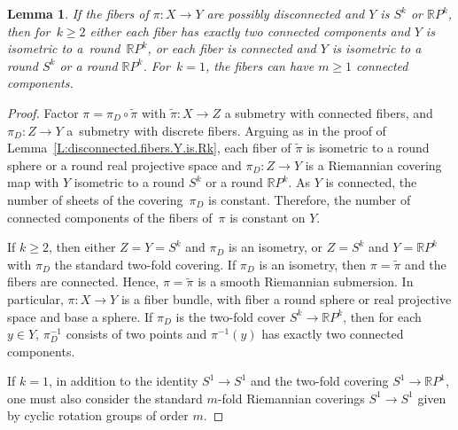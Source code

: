 \documentclass[10pt,a4paper]{amsart}
\numberwithin{equation}{section}
\newtheorem{lem}[thm]{Lemma}
\theoremstyle{definition}
\newcommand{\Sp}{S} %
\newcommand{\RP}{\mathbb{R}P} %
\begin{document}
\begin{lem}
If the fibers of $\pi\colon X\to Y$ are possibly disconnected and $Y$ is $S^k$ or $\RP^k$, then for~${k\geq 2}$ either each fiber has exactly two connected components and $Y$ is isometric to a~round~$\RP^{k}$, or each fiber is connected and $Y$ is isometric to a round $\Sp^k$ or a round $\RP^k$. For~${k=1}$, the fibers can have $m\geq 1$ connected components.
\end{lem}

\begin{proof}
Factor $\pi=\pi_D\circ\tilde{\pi}$ with $\tilde{\pi}\colon X\to Z$ a submetry with connected fibers, and $\pi_D\colon Z\to Y$ a~submetry with discrete fibers.
Arguing as in the proof of Lemma~\ref{L:disconnected.fibers.Y.is.Rk}, each fiber of $\tilde{\pi}$ is isometric to a round sphere or a round real projective space and $\pi_D\colon Z\to Y$ is a Riemannian covering map with $Y$ isometric to a round $S^k$ or a round $\RP^k$.
As $Y$ is connected, the number of sheets of the covering~$\pi_D$ is constant. Therefore, the number of connected components of the fibers of~$\pi$ is constant on $Y$.

If $k\geq 2$, then either $Z=Y = S^k$ and $\pi_D$ is an isometry, or $Z=S^k$ and $Y=\RP^k$ with $\pi_D$ the standard two-fold covering.
If $\pi_D$ is an isometry, then $\pi = \tilde{\pi}$ and the fibers are connected.
Hence, $\pi = \tilde{\pi}$ is a smooth Riemannian submersion. In particular, $\pi\colon X\to Y$ is a fiber bundle, with fiber a round sphere or real projective space and base a sphere. If $\pi_D$ is the two-fold cover $S^k\to \RP^k$, then for each $y\in Y$, $\pi^{-1}_D$ consists of two points and $\pi^{-1}(y)$ has exactly two connected components.

If $k=1$, in addition to the identity $S^1\to S^1$ and the two-fold covering $S^1\to \RP^1$, one must also consider the standard $m$-fold Riemannian coverings $S^1\to S^1$ given by cyclic rotation groups of order $m$.
\end{proof}
\end{document}
